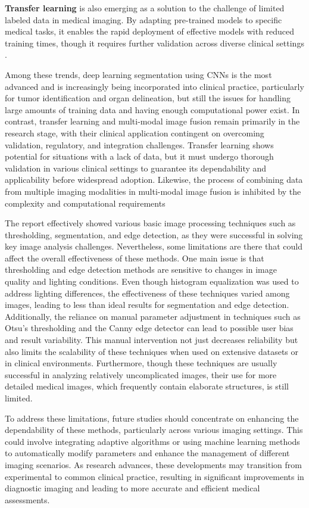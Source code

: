 \documentclass[%
	a4paper, %
	12pt, %
	english, %
	bibtotoc %
]{scrartcl}
\begin{document}
\textbf{Transfer learning} is also emerging as a solution to the challenge of limited labeled data in medical imaging. By adapting pre-trained models to specific medical tasks, it enables the rapid deployment of effective models with reduced training times, though it requires further validation across diverse clinical settings \cite{cheplygina_transfer_learning}.

Among these trends, deep learning segmentation using CNNs is the most advanced and is increasingly being incorporated into clinical practice, particularly for tumor identification and organ delineation, but still the issues for handling large amounts of training data and having enough computational power exist. In contrast, transfer learning and multi-modal image fusion remain primarily in the research stage, with their clinical application contingent on overcoming validation, regulatory, and integration challenges. Transfer learning shows potential for situations with a lack of data, but it must undergo thorough validation in various clinical settings to guarantee its dependability and applicability before widespread adoption. Likewise, the process of combining data from multiple imaging modalities in multi-modal image fusion is inhibited by the complexity and computational requirements

The report effectively showed various basic image processing techniques such as thresholding, segmentation, and edge detection, as they were successful in solving key image analysis challenges. Nevertheless, some limitations are there that could affect the overall effectiveness of these methods. One main issue is that thresholding and edge detection methods are sensitive to changes in image quality and lighting conditions. Even though histogram equalization was used to address lighting differences, the effectiveness of these techniques varied among images, leading to less than ideal results for segmentation and edge detection. Additionally, the reliance on manual parameter adjustment in techniques such as Otsu's thresholding and the Canny edge detector can lead to possible user bias and result variability. This manual intervention not just decreases reliability but also limits the scalability of these techniques when used on extensive datasets or in clinical environments. Furthermore, though these techniques are usually successful in analyzing relatively uncomplicated images, their use for more detailed medical images, which frequently contain elaborate structures, is still limited.

To address these limitations, future studies should concentrate on enhancing the dependability of these methods, particularly across various imaging settings. This could involve integrating adaptive algorithms or using machine learning methods to automatically modify parameters and enhance the management of different imaging scenarios. As research advances, these developments may transition from experimental to common clinical practice, resulting in significant improvements in diagnostic imaging and leading to more accurate and efficient medical assessments.

\newpage


\end{document}
